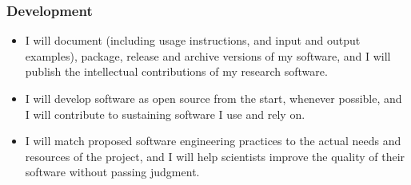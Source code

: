 \documentclass[a4paper,UKenglish]{dagman}
\renewcommand{\paragraph}[1]{\subsubsection*{#1}\xspace}
\begin{document}
%

\paragraph{Development}
\begin{itemize}
\item I will document (including usage instructions, and input and output examples), package, release and archive versions of my software, and I will publish the intellectual contributions of my research software.
\item I will develop software as open source from the start, whenever possible, and I will contribute to sustaining software I use and rely on.
\item I will match proposed software engineering practices to the actual needs and resources of the project, and I will help scientists improve the quality of their software without passing judgment.


\end{itemize}
\end{document}
